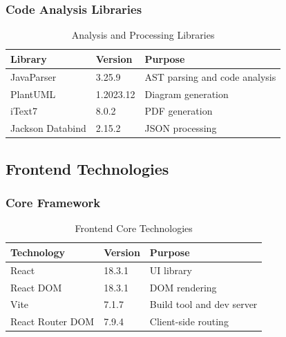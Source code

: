 \documentclass[12pt,a4paper]{article}
\begin{document}
    \subsubsection{Code Analysis Libraries}

    \begin{table}[H]
        \caption{Analysis and Processing Libraries}
        \begin{tabular}{|l|l|p{6cm}|}
            \hline
            \textbf{Library} & \textbf{Version} & \textbf{Purpose} \\
            \hline
            JavaParser & 3.25.9 & AST parsing and code analysis \\
            \hline
            PlantUML & 1.2023.12 & Diagram generation \\
            \hline
            iText7 & 8.0.2 & PDF generation \\
            \hline
            Jackson Databind & 2.15.2 & JSON processing \\
            \hline
        \end{tabular}
    \end{table}

    \subsection{Frontend Technologies}

    \subsubsection{Core Framework}

    \begin{table}[H]
        \caption{Frontend Core Technologies}
        \begin{tabular}{|l|l|p{6cm}|}
            \hline
            \textbf{Technology} & \textbf{Version} & \textbf{Purpose} \\
            \hline
            React & 18.3.1 & UI library \\
            \hline
            React DOM & 18.3.1 & DOM rendering \\
            \hline
            Vite & 7.1.7 & Build tool and dev server \\
            \hline
            React Router DOM & 7.9.4 & Client-side routing \\
            \hline
        \end{tabular}
    \end{table}
\end{document}
